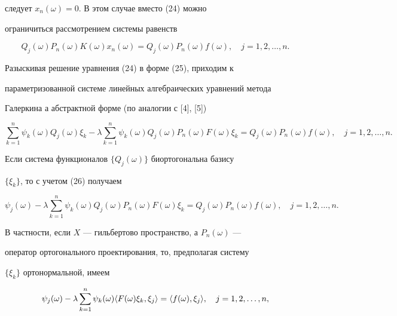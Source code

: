следует $x_n(\omega)=0$. В этом случае вместо (24) можно


ограничиться рассмотрением системы равенств


$$


Q_j(\omega)P_n(\omega)K(\omega)x_n(\omega)=


Q_j(\omega)P_n(\omega)f(\omega),\quad j=1,2,\dotsc,n.


$$


Разыскивая решение уравнения (24) в форме (25), приходим к


параметризованной системе линейных алгебраических уравнений метода


Галеркина а абстрактной форме (по аналогии с [4], [5])


\begin{equation}


\sum^n_{k=1}\psi_k(\omega)Q_j(\omega)\xi_k-\lambda


\sum^n_{k=1}\psi_k(\omega)Q_j(\omega)P_n(\omega)


F(\omega)\xi_k=Q_j(\omega)P_n(\omega)f(\omega),\quad


j=1,2,\dotsc,n.


\end{equation}





Если система функционалов $\{Q_j(\omega)\}$ биортогональна базису


$\{\xi_k\}$, то с учетом (26) получаем


$$


\psi_j(\omega)-\lambda\sum^n_{k=1}\psi_k(\omega)


Q_j(\omega)P_n(\omega)F(\omega)\xi_k=


Q_j(\omega)P_n(\omega)f(\omega),\quad j=1,2,\dotsc,n.


$$


В частности, если $X$ --- гильбертово пространство, а $P_n(\omega)$ ---


оператор ортогонального проектирования, то, предполагая систему


$\{\xi_k\}$ ортонормальной, имеем


\begin{equation}


\psi_j(\omega)-\lambda\sum^n_{k=1}\psi_k(\omega)


\la F(\omega)\xi_k,\xi_j\ra=


\la f(\omega),\xi_j\ra,\quad j=1,2,\dotsc,n,


\end{equation}


